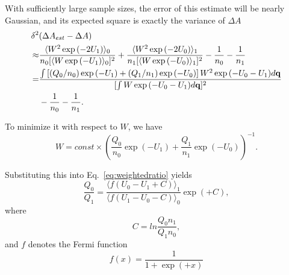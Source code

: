 With sufficiently large sample sizes, the error of this estimate will
be nearly Gaussian, and its expected square is exactly the variance
of $\Delta A$ 
\begin{align}
	\delta^2 & (\Delta A_{est}-\Delta A)\nonumber \\
	\approx & \frac{\langle W^{2}\exp{(-2U_{1})}\rangle_{0}}{n_{0}[\langle W\exp{(-U_{1})}\rangle_{0}]^{2}}+\frac{\langle W^{2}\exp{(-2U_{0})}\rangle_{1}}{n_{1}[\langle W\exp{(-U_{0})}\rangle_{1}]^{2}}-\frac{1}{n_{0}}-\frac{1}{n_{1}}\nonumber \\
	= & \frac{\int\left[(Q_{0}/n_{0})\exp{(-U_{1})}+(Q_{1}/n_{1})\exp{(-U_{0})}\right]W^{2}\exp{(-U_{0}-U_{1})}d\mathbf{{q}}}{[\int W\exp{(-U_{0}-U_{1})}d\mathbf{{q}}]^{2}}\notag\\
	  &-\frac{1}{n_{0}}-\frac{1}{n_{1}}.\label{eq:expectation}
\end{align}

To minimize it with respect to $W$, we have
\begin{equation}
	W=const\times\left(\frac{Q_{0}}{n_{0}}\exp{(-U_{1})}+\frac{Q_{1}}{n_{1}}\exp{(-U_{0})}\right)^{-1}.
\end{equation}

Substituting this into Eq.~\ref{eq:weightedratio} yields
\begin{equation}
	\frac{Q_{0}}{Q_{1}}=\frac{\langle f(U_{0}-U_{1}+C)\rangle_{1}}{\langle f(U_{1}-U_{0}-C)\rangle_{0}}\exp{(+C)},
	\label{Eq:FEM:BAR:BAR}
\end{equation}
where
\begin{equation}
	C=ln\frac{Q_{0}n_{1}}{Q_{1}n_{0}},
\end{equation}
and $f$ denotes the Fermi function
\begin{equation}
	f(x)=\frac{1}{1+\exp{(+x)}}
\end{equation}